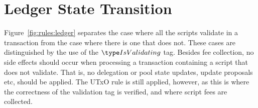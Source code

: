 \section{Ledger State Transition}
\label{sec:ledger-trans}

Figure~\ref{fig:rules:ledger} separates the case where all the scripts
validate in a transaction from the case where there is one that does not.
These cases are distinguished by the use of the $\IsValidating$ tag.
%
Besides fee collection, no side effects should occur when processing a
transaction containing a script that does not validate. That is, no
delegation or pool state updates, update proposals etc, should be
applied. The UTxO rule is still applied, however, as this is where the correctness of the
validation tag is verified, and where script fees are collected.

